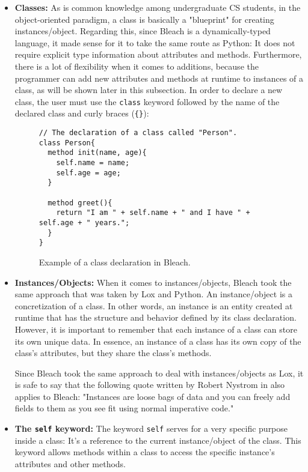 \begin{itemize}
    \item \textbf{Classes:} As is common knowledge among undergraduate CS students, in the object-oriented paradigm, a class is basically a "blueprint" for creating instances/object. Regarding this, since Bleach is a dynamically-typed language, it made sense for it to take the same route as Python: It does not require explicit type information about attributes and methods. Furthermore, there is a lot of flexibility when it comes to additions, because the programmer can add new attributes and methods at runtime to instances of a class, as will be shown later in this subsection. In order to declare a new class, the user must use the \texttt{class} keyword followed by the name of the declared class and curly braces (\texttt{\{\}}):
\begin{figure}[H]
    \centering
    \begin{lstlisting}
// The declaration of a class called "Person".
class Person{
  method init(name, age){
    self.name = name;
    self.age = age;
  }

  method greet(){
    return "I am " + self.name + " and I have " + self.age + " years.";
  }
}
    \end{lstlisting}
    \caption{Example of a class declaration in Bleach.}
\end{figure}

    \item \textbf{Instances/Objects:} When it comes to instances/objects, Bleach took the same approach that was taken by Lox and Python. An instance/object is a concretization of a class. In other words, an instance is an entity created at runtime that has the structure and behavior defined by its class declaration. However, it is important to remember that each instance of a class can store its own unique data. In essence, an instance of a class has its own copy of the class’s attributes, but they share the class's methods.

    Since Bleach took the same approach to deal with instances/objects as Lox, it is safe to say that the following quote written by Robert Nystrom in \cite{nystrom2021crafting} also applies to Bleach: "Instances are loose bags of data and you can freely add fields to them as you see fit using normal imperative code."
    
    \item \textbf{The \texttt{self} keyword:} The keyword \texttt{self} serves for a very specific purpose inside a class: It's a reference to the current instance/object of the class. This keyword allows methods within a class to access the specific instance's attributes and other methods.
    

\end{itemize}
